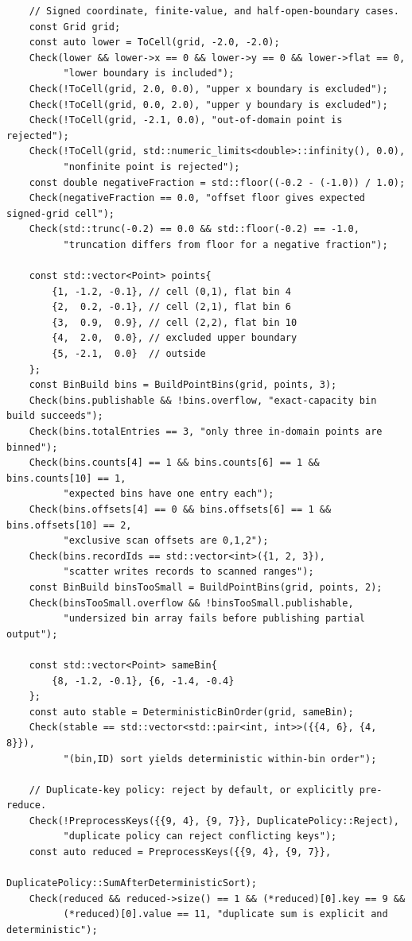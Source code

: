 \begin{verbatim}
    // Signed coordinate, finite-value, and half-open-boundary cases.
    const Grid grid;
    const auto lower = ToCell(grid, -2.0, -2.0);
    Check(lower && lower->x == 0 && lower->y == 0 && lower->flat == 0,
          "lower boundary is included");
    Check(!ToCell(grid, 2.0, 0.0), "upper x boundary is excluded");
    Check(!ToCell(grid, 0.0, 2.0), "upper y boundary is excluded");
    Check(!ToCell(grid, -2.1, 0.0), "out-of-domain point is rejected");
    Check(!ToCell(grid, std::numeric_limits<double>::infinity(), 0.0),
          "nonfinite point is rejected");
    const double negativeFraction = std::floor((-0.2 - (-1.0)) / 1.0);
    Check(negativeFraction == 0.0, "offset floor gives expected signed-grid cell");
    Check(std::trunc(-0.2) == 0.0 && std::floor(-0.2) == -1.0,
          "truncation differs from floor for a negative fraction");

    const std::vector<Point> points{
        {1, -1.2, -0.1}, // cell (0,1), flat bin 4
        {2,  0.2, -0.1}, // cell (2,1), flat bin 6
        {3,  0.9,  0.9}, // cell (2,2), flat bin 10
        {4,  2.0,  0.0}, // excluded upper boundary
        {5, -2.1,  0.0}  // outside
    };
    const BinBuild bins = BuildPointBins(grid, points, 3);
    Check(bins.publishable && !bins.overflow, "exact-capacity bin build succeeds");
    Check(bins.totalEntries == 3, "only three in-domain points are binned");
    Check(bins.counts[4] == 1 && bins.counts[6] == 1 && bins.counts[10] == 1,
          "expected bins have one entry each");
    Check(bins.offsets[4] == 0 && bins.offsets[6] == 1 && bins.offsets[10] == 2,
          "exclusive scan offsets are 0,1,2");
    Check(bins.recordIds == std::vector<int>({1, 2, 3}),
          "scatter writes records to scanned ranges");
    const BinBuild binsTooSmall = BuildPointBins(grid, points, 2);
    Check(binsTooSmall.overflow && !binsTooSmall.publishable,
          "undersized bin array fails before publishing partial output");

    const std::vector<Point> sameBin{
        {8, -1.2, -0.1}, {6, -1.4, -0.4}
    };
    const auto stable = DeterministicBinOrder(grid, sameBin);
    Check(stable == std::vector<std::pair<int, int>>({{4, 6}, {4, 8}}),
          "(bin,ID) sort yields deterministic within-bin order");

    // Duplicate-key policy: reject by default, or explicitly pre-reduce.
    Check(!PreprocessKeys({{9, 4}, {9, 7}}, DuplicatePolicy::Reject),
          "duplicate policy can reject conflicting keys");
    const auto reduced = PreprocessKeys({{9, 4}, {9, 7}},
                                        DuplicatePolicy::SumAfterDeterministicSort);
    Check(reduced && reduced->size() == 1 && (*reduced)[0].key == 9 &&
          (*reduced)[0].value == 11, "duplicate sum is explicit and deterministic");


\end{verbatim}
